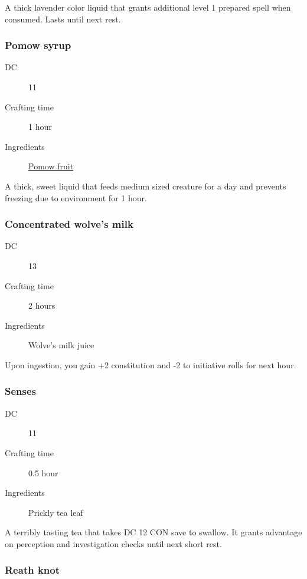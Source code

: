 A thick lavender color liquid that grants additional level 1 prepared spell when consumed. Lasts until next rest.

\subsubsection{Pomow syrup}
\label{Pomow syrup}

\begin{description}
\item [DC] 11
\item [Crafting time] 1 hour
\item [Ingredients] \hyperref[Pomow]{Pomow fruit}
\end{description}

A thick, sweet liquid that feeds medium sized creature for a day and prevents freezing 
due to environment for 1 hour.

\subsubsection{Concentrated wolve's milk}

\begin{description}
\item [DC] 13
\item [Crafting time] 2 hours
\item [Ingredients] Wolve's milk juice
\end{description}

Upon ingestion, you gain +2 constitution and -2 to initiative rolls for next hour.

\subsubsection{Senses}
\label{Senses}

\begin{description}
\item [DC] 11
\item [Crafting time] 0.5 hour
\item [Ingredients] Prickly tea leaf
\end{description}

A terribly tasting tea that takes DC 12 CON save to swallow. 
It grants advantage on perception and investigation checks until next short rest.

\subsubsection{Reath knot}
\label{Reath knot}

